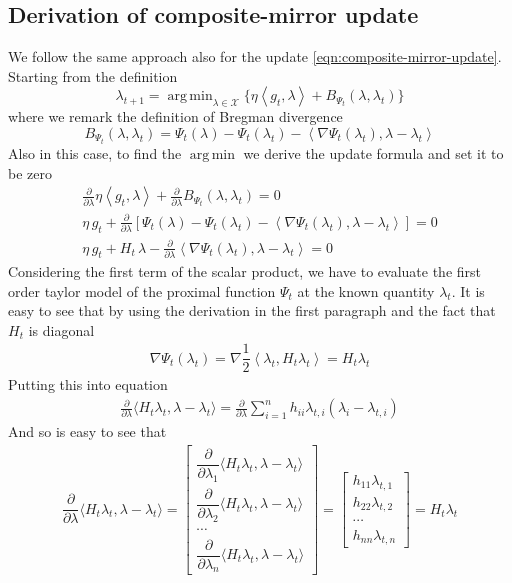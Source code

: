 \documentclass[notitlepage]{article}
\DeclareMathOperator*{\argmin}{arg\,min}
\begin{document}
\subsection{Derivation of composite-mirror update}
We follow the same approach also for the update \eqref{eqn:composite-mirror-update}. Starting from the definition
\[
  \lambda_{t+1} = \argmin_{\lambda \in \mathcal{X}} \{ \eta \left\langle g_t,\lambda \right\rangle + B_{\Psi_t} (\lambda,\lambda_t) \}
\]
where we remark the definition of Bregman divergence
\[
  B_{\Psi_t} (\lambda,\lambda_t) = \Psi_t(\lambda) - \Psi_t(\lambda_t) - \left\langle \nabla \Psi_t(\lambda_t),\lambda-\lambda_t \right\rangle  
\]
Also in this case, to find the $\argmin$ we derive the update formula and set it to be zero
\begin{align*}
  \frac{\partial}{\partial \lambda} \eta \left\langle g_t,\lambda \right\rangle + \frac{\partial}{\partial \lambda} B_{\Psi_t} (\lambda,\lambda_t) = 0 \\ 
  \eta\, g_t + \frac{\partial}{\partial \lambda} \left[ \Psi_t(\lambda) - \Psi_t(\lambda_t) - \left\langle \nabla \Psi_t(\lambda_t),\lambda-\lambda_t \right\rangle \right] = 0 \\
  \eta\, g_t + H_t\, \lambda - \frac{\partial}{\partial \lambda} \left\langle \nabla \Psi_t(\lambda_t),\lambda-\lambda_t \right\rangle = 0
\end{align*}
Considering the first term of the scalar product, we have to evaluate the first order taylor model of the proximal function $\Psi_t$ at the
known quantity $\lambda_t$. It is easy to see that by using the derivation in the first paragraph and the fact that $H_t$ is diagonal
\begin{align*}
  \nabla \Psi_t(\lambda_t) = \nabla \dfrac{1}{2} \left\langle \lambda_t, H_t \lambda_t \right\rangle = H_t \lambda_t
\end{align*}
Putting this into equation
\begin{align*}
  \frac{\partial}{\partial \lambda} \langle H_t \lambda_t, \lambda - \lambda_t \rangle = \frac{\partial}{\partial \lambda} \sum_{i=1}^n h_{ii} \lambda_{t,i} (\lambda_i - \lambda_{t,i})
\end{align*}
And so is easy to see that
\begin{align*}
  \dfrac{\partial}{\partial \lambda} \langle H_t \lambda_t, \lambda - \lambda_t \rangle = 
  \begin{bmatrix}
    \dfrac{\partial}{\partial \lambda_1} \langle H_t \lambda_t, \lambda - \lambda_t \rangle \\[3ex]
    \dfrac{\partial}{\partial \lambda_2} \langle H_t \lambda_t, \lambda - \lambda_t \rangle \\[3ex]
    \cdots \\[3ex]
    \dfrac{\partial}{\partial \lambda_n} \langle H_t \lambda_t, \lambda - \lambda_t \rangle
  \end{bmatrix} 
  =
  \begin{bmatrix}
    h_{11} \lambda_{t,1} \\[2ex]
    h_{22} \lambda_{t,2} \\[2ex]
    \cdots \\[2ex]
    h_{nn} \lambda_{t,n}
  \end{bmatrix}
  = 
  H_t \lambda_t
\end{align*} 
\end{document}
